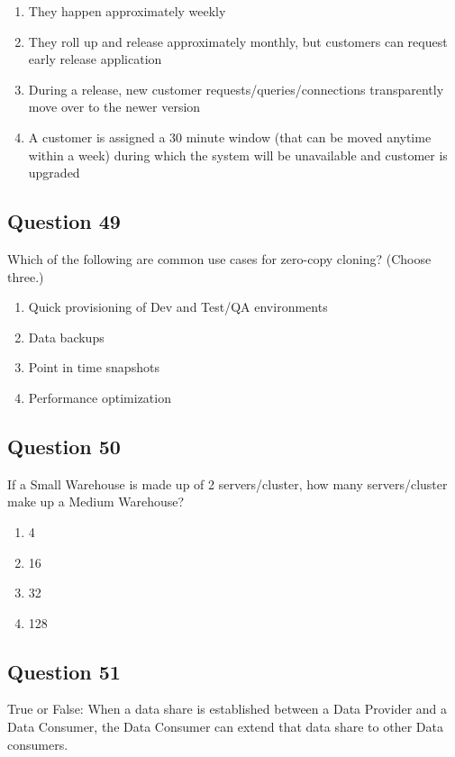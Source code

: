 \documentclass[12pt]{article}
\begin{document}
\begin{enumerate}[label=\Alph*.]
  \item They happen approximately weekly
  \item They roll up and release approximately monthly, but customers can request early release application
  \item During a release, new customer requests/queries/connections transparently move over to the newer version
  \item A customer is assigned a 30 minute window (that can be moved anytime within a week) during which the system will be unavailable and customer is upgraded
\end{enumerate}

\subsection*{Question 49}
Which of the following are common use cases for zero-copy cloning? (Choose three.)

\begin{enumerate}[label=\Alph*.]
  \item Quick provisioning of Dev and Test/QA environments
  \item Data backups
  \item Point in time snapshots
  \item Performance optimization
\end{enumerate}

\subsection*{Question 50}
If a Small Warehouse is made up of 2 servers/cluster, how many servers/cluster make up a Medium Warehouse?

\begin{enumerate}[label=\Alph*.]
  \item 4
  \item 16
  \item 32
  \item 128
\end{enumerate}

\subsection*{Question 51}
True or False: When a data share is established between a Data Provider and a Data Consumer, the Data Consumer can extend that data share to other Data consumers.
\end{document}
